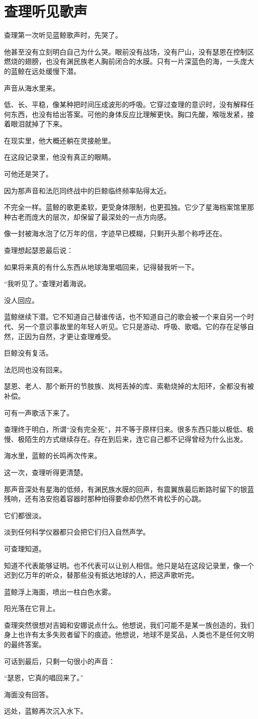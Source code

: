 \chapter{查理听见歌声}

查理第一次听见蓝鲸歌声时，先哭了。

他甚至没有立刻明白自己为什么哭。眼前没有战场，没有尸山，没有瑟恩在控制区燃烧的翅膀，也没有渊民族老人胸前闭合的水膜。只有一片深蓝色的海，一头庞大的蓝鲸在远处缓慢下潜。

声音从海水里来。

低、长、平稳，像某种把时间压成波形的呼吸。它穿过查理的意识时，没有解释任何东西，也没有给出答案。可他的身体反应比理解更快。胸口先酸，喉咙发紧，接着眼泪就掉了下来。

在现实里，他大概还躺在灵接舱里。

在这段记录里，他没有真正的眼睛。

可他还是哭了。

因为那声音和法厄同终战中的巨鲸临终频率贴得太近。

不完全一样。蓝鲸的歌更柔软，更受身体限制，也更孤独。它少了星海档案馆里那种古老而庞大的层次，却保留了最深处的一点方向感。

像一封被海水泡了亿万年的信，字迹早已模糊，只剩开头那个称呼还在。

查理想起瑟恩最后说：

如果将来真的有什么东西从地球海里唱回来，记得替我听一下。

“我听见了。”查理对着海说。

没人回应。

蓝鲸继续下潜。它不知道自己替谁传话，也不知道自己的歌会被一个来自另一个时代、另一个意识事故里的年轻人听见。它只是游动、呼吸、歌唱。它的存在足够自然，正因为自然，才更让查理难受。

巨鲸没有复活。

法厄同也没有回来。

瑟恩、老人、那个断开的节肢族、岚柯丢掉的库、索勒烧掉的太阳环，全都没有被补偿。

可有一声歌活下来了。

查理终于明白，所谓“没有完全死”，并不等于原样归来。很多东西只能以极低、极慢、极陌生的方式继续存在。存在到后来，连它自己都不记得曾经为什么出发。

海水里，蓝鲸的长鸣再次传来。

这一次，查理听得更清楚。

那声音深处有星海的低频，有渊民族水膜的回声，有震翼族最后断路时留下的银蓝残响，还有洛安抱着容器时那种怕得要命却仍然不肯松手的心跳。

它们都很淡。

淡到任何科学仪器都只会把它们归入自然声学。

可查理知道。

知道不代表能够证明。也不代表可以让别人相信。他只是站在这段记录里，像一个迟到亿万年的听众，替那些没有抵达地球的人，把这声歌听完。

蓝鲸浮上海面，喷出一柱白色水雾。

阳光落在它背上。

查理突然很想对吉姆和安娜说点什么。他想说，我们可能不是某一族创造的，我们身上也许有太多失败者留下的痕迹。他想说，地球不是奖品，人类也不是任何文明的最终答案。

可话到最后，只剩一句很小的声音：

“瑟恩，它真的唱回来了。”

海面没有回答。

远处，蓝鲸再次沉入水下。
